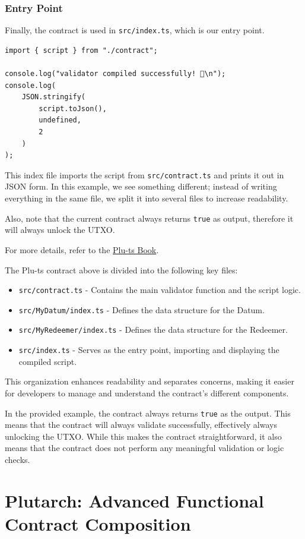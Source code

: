 \subsubsection{Entry Point}
Finally, the contract is used in \texttt{src/index.ts}, which is our entry point.

\begin{lstlisting}
import { script } from "./contract";

console.log("validator compiled successfully! 🎉\n");
console.log(
    JSON.stringify(
        script.toJson(),
        undefined,
        2
    )
);
\end{lstlisting}

This index file imports the script from \texttt{src/contract.ts} and prints it out in JSON form. In this example, we see something different; instead of writing everything in the same file, we split it into several files to increase readability.

Also, note that the current contract always returns \texttt{true} as output, therefore it will always unlock the UTXO.

For more details, refer to the \href{https://book.plu-ts.dev/}{Plu-ts Book}.

The Plu-ts contract above is divided into the following key files:
\begin{itemize}
  \item \texttt{src/contract.ts} - Contains the main validator function and the script logic.
  \item \texttt{src/MyDatum/index.ts} - Defines the data structure for the Datum.
  \item \texttt{src/MyRedeemer/index.ts} - Defines the data structure for the Redeemer.
  \item \texttt{src/index.ts} - Serves as the entry point, importing and displaying the compiled script.
\end{itemize}

This organization enhances readability and separates concerns, making it easier for developers to manage and understand the contract's different components. 

In the provided example, the contract always returns \texttt{true} as the output.
This means that the contract will always validate successfully, effectively always unlocking the UTXO. While this makes the contract straightforward, it also means that the contract does not perform any meaningful validation or logic checks.

\section{Plutarch: Advanced Functional Contract Composition} \label{sec:Plutarch}

